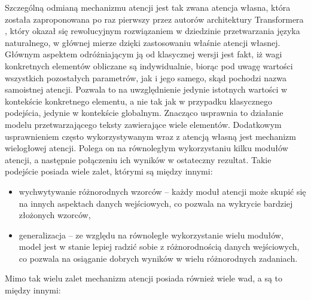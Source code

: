 Szczególną odmianą mechanizmu atencji jest tak zwana atencja własna, która została zaproponowana po raz pierwszy przez autorów architektury Transformera \cite{transformer}, który okazał się rewolucyjnym rozwiązaniem w dziedzinie przetwarzania języka naturalnego, w głównej mierze dzięki zastosowaniu właśnie atencji własnej. Głównym aspektem odróżniającym ją od klasycznej wersji jest fakt, iż wagi konkretnych elementów obliczane są indywidualnie, biorąc pod uwagę wartości wszystkich pozostałych parametrów, jak i jego samego, skąd pochodzi nazwa samoistnej atencji. Pozwala to na uwzględnienie jedynie istotnych wartości w kontekście konkretnego elementu, a nie tak jak w przypadku klasycznego podejścia, jedynie w kontekście globalnym. Znacząco usprawnia to działanie modelu przetwarzającego teksty zawierające wiele elementów. Dodatkowym usprawnieniem często wykorzystywanym wraz z atencją własną jest mechanizm wielogłowej atencji. Polega on na równoległym wykorzystaniu kilku modułów atencji, a następnie połączeniu ich wyników w ostateczny rezultat. Takie podejście posiada wiele zalet, którymi są między innymi:
\begin{itemize}
  \item wychwytywanie różnorodnych wzorców -- każdy moduł atencji może skupić się na innych aspektach danych wejściowych, co pozwala na wykrycie bardziej złożonych wzorców,
  \item generalizacja -- ze względu na równoległe wykorzystanie wielu modułów, model jest w stanie lepiej radzić sobie z różnorodnością danych wejściowych, co pozwala na osiąganie dobrych wyników w wielu różnorodnych zadaniach.
\end{itemize}
\noindent Mimo tak wielu zalet mechanizm atencji posiada również wiele wad, a są to między innymi:
